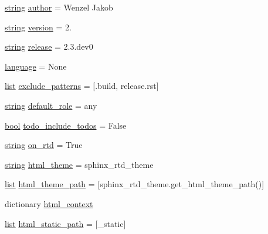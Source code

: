 \begin{DoxyCompactItemize}
\item 
\mbox{\hyperlink{asdl_8h_ae84541b4f3d8e1ea24ec0f466a8c568b}{string}} \mbox{\hyperlink{namespaceconf_a637c239d256432248aa8d9f3ab0b8c52}{author}} = \textquotesingle{}Wenzel Jakob\textquotesingle{}
\item 
\mbox{\hyperlink{asdl_8h_ae84541b4f3d8e1ea24ec0f466a8c568b}{string}} \mbox{\hyperlink{namespaceconf_ade15c5b54093b64d7c428ec19ca5b1cb}{version}} = \textquotesingle{}2.\textquotesingle{}
\item 
\mbox{\hyperlink{asdl_8h_ae84541b4f3d8e1ea24ec0f466a8c568b}{string}} \mbox{\hyperlink{namespaceconf_a325dc746d8bf05c54d26351c35a21d90}{release}} = \textquotesingle{}2.\+3.dev0\textquotesingle{}
\item 
\mbox{\hyperlink{namespaceconf_ad76a2e6d7bfa880ebb4042c08e8b4e12}{language}} = None
\item 
\mbox{\hyperlink{classlist}{list}} \mbox{\hyperlink{namespaceconf_a7ad48fb6f3e9b129c02346ea0d3527c1}{exclude\+\_\+patterns}} = \mbox{[}\textquotesingle{}.build\textquotesingle{}, \textquotesingle{}release.\+rst\textquotesingle{}\mbox{]}
\item 
\mbox{\hyperlink{asdl_8h_ae84541b4f3d8e1ea24ec0f466a8c568b}{string}} \mbox{\hyperlink{namespaceconf_a038ead0be6737e911aede67886fcedca}{default\+\_\+role}} = \textquotesingle{}any\textquotesingle{}
\item 
\mbox{\hyperlink{asdl_8h_af6a258d8f3ee5206d682d799316314b1}{bool}} \mbox{\hyperlink{namespaceconf_a8fe7f0d85f975f4ecba5cb6066959a09}{todo\+\_\+include\+\_\+todos}} = False
\item 
\mbox{\hyperlink{asdl_8h_ae84541b4f3d8e1ea24ec0f466a8c568b}{string}} \mbox{\hyperlink{namespaceconf_ac9f32ab656bf05ad872fd46e03504cc8}{on\+\_\+rtd}} = \textquotesingle{}True\textquotesingle{}
\item 
\mbox{\hyperlink{asdl_8h_ae84541b4f3d8e1ea24ec0f466a8c568b}{string}} \mbox{\hyperlink{namespaceconf_a6c3bfcc1a44546c1c75ce20f55bd0fd6}{html\+\_\+theme}} = \textquotesingle{}sphinx\+\_\+rtd\+\_\+theme\textquotesingle{}
\item 
\mbox{\hyperlink{classlist}{list}} \mbox{\hyperlink{namespaceconf_a4960231f83b1b44a1ffcd212903b62e8}{html\+\_\+theme\+\_\+path}} = \mbox{[}sphinx\+\_\+rtd\+\_\+theme.\+get\+\_\+html\+\_\+theme\+\_\+path()\mbox{]}
\item 
dictionary \mbox{\hyperlink{namespaceconf_abe0cf752a6ed0f200c82339faf9b56ff}{html\+\_\+context}}
\item 
\mbox{\hyperlink{classlist}{list}} \mbox{\hyperlink{namespaceconf_af4fb5d8851ccaade135c2668dd3ced41}{html\+\_\+static\+\_\+path}} = \mbox{[}\textquotesingle{}\+\_\+static\textquotesingle{}\mbox{]}

\end{DoxyCompactItemize}
